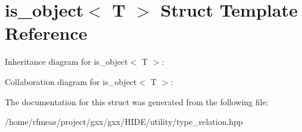 \hypertarget{structis__object}{}\section{is\+\_\+object$<$ T $>$ Struct Template Reference}
\label{structis__object}


Inheritance diagram for is\+\_\+object$<$ T $>$\+:


Collaboration diagram for is\+\_\+object$<$ T $>$\+:


The documentation for this struct was generated from the following file\+:\begin{DoxyCompactItemize}
\item 
/home/rfmeas/project/gxx/gxx/\+H\+I\+D\+E/utility/type\+\_\+relation.\+hpp\end{DoxyCompactItemize}

